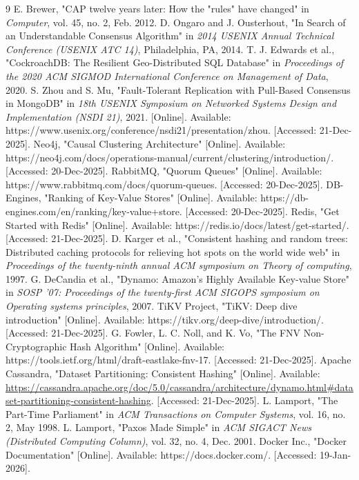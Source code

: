 \documentclass[shortabstract]{iithesis}
\begin{document}
\begin{thebibliography}{9}
 E. Brewer, "CAP twelve years later: How the "rules" have changed" in \textit{Computer}, vol. 45, no. 2, Feb. 2012.
 D. Ongaro and J. Ousterhout, "In Search of an Understandable Consensus Algorithm" in \textit{2014 USENIX Annual Technical Conference (USENIX ATC 14)}, Philadelphia, PA, 2014.
 T. J. Edwards et al., "CockroachDB: The Resilient Geo-Distributed SQL Database" in \textit{Proceedings of the 2020 ACM SIGMOD International Conference on Management of Data}, 2020.
 S. Zhou and S. Mu, "Fault-Tolerant Replication with Pull-Based Consensus in MongoDB" in \textit{18th USENIX Symposium on Networked Systems Design and Implementation (NSDI 21)}, 2021. [Online]. Available: https://www.usenix.org/conference/nsdi21/presentation/zhou. [Accessed: 21-Dec-2025].
 Neo4j, "Causal Clustering Architecture" [Online]. Available: https://neo4j.com/docs/operations-manual/current/clustering/introduction/. [Accessed: 20-Dec-2025].
 RabbitMQ, "Quorum Queues" [Online]. Available: https://www.rabbitmq.com/docs/quorum-queues. [Accessed: 20-Dec-2025].
 DB-Engines, "Ranking of Key-Value Stores" [Online]. Available: https://db-engines.com/en/ranking/key-value+store. [Accessed: 20-Dec-2025].
 Redis, "Get Started with Redis" [Online]. Available: https://redis.io/docs/latest/get-started/. [Accessed: 21-Dec-2025].
 D. Karger et al., "Consistent hashing and random trees: Distributed caching protocols for relieving hot spots on the world wide web" in \textit{Proceedings of the twenty-ninth annual ACM symposium on Theory of computing}, 1997.
 G. DeCandia et al., "Dynamo: Amazon's Highly Available Key-value Store" in \textit{SOSP '07: Proceedings of the twenty-first ACM SIGOPS symposium on Operating systems principles}, 2007.
 TiKV Project, "TiKV: Deep dive introduction" [Online]. Available: https://tikv.org/deep-dive/introduction/. [Accessed: 21-Dec-2025].
 G. Fowler, L. C. Noll, and K. Vo, "The FNV Non-Cryptographic Hash Algorithm" [Online]. Available: https://tools.ietf.org/html/draft-eastlake-fnv-17. [Accessed: 21-Dec-2025].
 Apache Cassandra, "Dataset Partitioning: Consistent Hashing" [Online]. Available: \url{https://cassandra.apache.org/doc/5.0/cassandra/architecture/dynamo.html\#dataset-partitioning-consistent-hashing}. [Accessed: 21-Dec-2025].
 L. Lamport, "The Part-Time Parliament" in \textit{ACM Transactions on Computer Systems}, vol. 16, no. 2, May 1998.
 L. Lamport, "Paxos Made Simple" in \textit{ACM SIGACT News (Distributed Computing Column)}, vol. 32, no. 4, Dec. 2001.
 Docker Inc., "Docker Documentation" [Online]. Available: https://docs.docker.com/. [Accessed: 19-Jan-2026].
\end{thebibliography}
\end{document}
